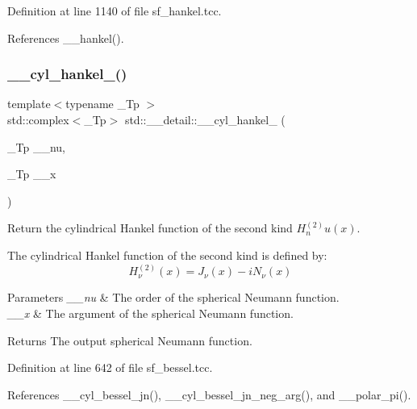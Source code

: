 Definition at line 1140 of file sf\+\_\+hankel.\+tcc.



References \+\_\+\+\_\+hankel().

\mbox{\label{namespacestd_1_1____detail_a98615677d4042ef02fe2faf326f1a614}} 
\subsubsection{\texorpdfstring{\+\_\+\+\_\+cyl\+\_\+hankel\+\_()}{\_\_cyl\_hankel\_2()}\hspace{0.1cm}{\footnotesize\ttfamily [1/2]}}
{\footnotesize\ttfamily template$<$typename \+\_\+\+Tp $>$ \\
std\+::complex$<$\+\_\+\+Tp$>$ std\+::\+\_\+\+\_\+detail\+::\+\_\+\+\_\+cyl\+\_\+hankel\+\_ (\begin{DoxyParamCaption}\item[{\+\_\+\+Tp}]{\+\_\+\+\_\+nu,  }\item[{\+\_\+\+Tp}]{\+\_\+\+\_\+x }\end{DoxyParamCaption})}



Return the cylindrical Hankel function of the second kind $ H^{(2)}_nu(x) $. 

The cylindrical Hankel function of the second kind is defined by\+: \[ H^{(2)}_\nu(x) = J_\nu(x) - i N_\nu(x) \]


\begin{DoxyParams}{Parameters}
{\em \+\_\+\+\_\+nu} & The order of the spherical Neumann function. \\
\hline
{\em \+\_\+\+\_\+x} & The argument of the spherical Neumann function. \\
\hline
\end{DoxyParams}
\begin{DoxyReturn}{Returns}
The output spherical Neumann function. 
\end{DoxyReturn}


Definition at line 642 of file sf\+\_\+bessel.\+tcc.



References \+\_\+\+\_\+cyl\+\_\+bessel\+\_\+jn(), \+\_\+\+\_\+cyl\+\_\+bessel\+\_\+jn\+\_\+neg\+\_\+arg(), and \+\_\+\+\_\+polar\+\_\+pi().

